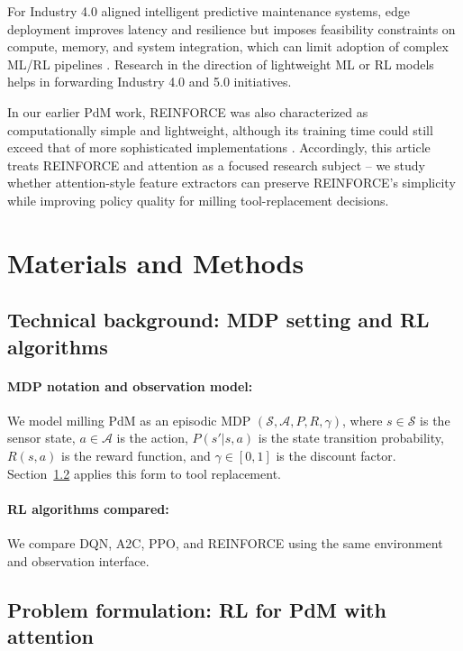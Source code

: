 \documentclass[sn-basic]{sn-jnl}%
\begin{document}
For Industry 4.0 aligned intelligent predictive maintenance systems, edge deployment improves latency and resilience but imposes feasibility constraints on compute, memory, and system integration, which can limit adoption of complex ML/RL pipelines \cite{Njor2024, Pandey2023}. Research in the direction of lightweight ML or RL models helps in forwarding Industry 4.0 and 5.0 initiatives.

In our earlier PdM work, \textsc{REINFORCE} was also characterized as computationally simple and lightweight, although its training time could still exceed that of more sophisticated implementations \cite{Siraskar2025}. Accordingly, this article treats \textsc{REINFORCE} and attention as a focused research subject -- we study whether attention-style feature extractors can preserve REINFORCE's simplicity while improving policy quality for milling tool-replacement decisions.

\section{Materials and Methods}\label{sec:method}

\subsection{Technical background: MDP setting and RL algorithms}\label{sec:tech_background}
\paragraph{MDP notation and observation model:}
We model milling PdM as an episodic MDP $(\mathcal{S},\mathcal{A},P,R,\gamma)$, where $s \in \mathcal{S}$ is the sensor state, $a \in \mathcal{A}$ is the action, $P(s'|s,a)$ is the state transition probability, $R(s,a)$ is the reward function, and $\gamma \in [0,1]$ is the discount factor. Section~\ref{sec:env} applies this form to tool replacement.

\paragraph{RL algorithms compared:}
We compare DQN, A2C, PPO, and \textsc{REINFORCE} using the same environment and observation interface.

\subsection{Problem formulation: RL for PdM with attention} \label{sec:env}
\end{document}
